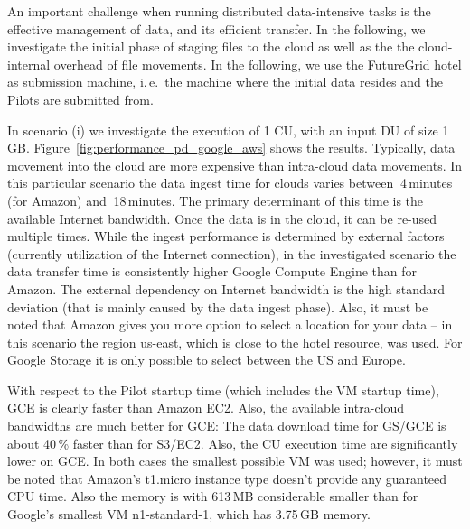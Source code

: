 \documentclass[times]{cpeauth}
\newcommand{\pilot}{Pilot\xspace}
\newcommand{\pilots}{Pilots\xspace}
\newcommand{\du}{DU\xspace}
\newcommand{\cu}{CU\xspace}
\begin{document}
An important challenge when running distributed data-intensive tasks is the 
effective management of data, and its efficient transfer. In the following, we 
investigate the initial phase of staging files to the cloud as well as the 
the cloud-internal overhead of file movements.  In the following, we use the 
FutureGrid hotel as submission machine, i.\,e.\ the machine where the initial 
data resides and the \pilots are submitted from.

In scenario (i) we investigate the execution of 1 \cu, with an input \du of
size 1\,GB. Figure~\ref{fig:performance_pd_google_aws} shows the results.
Typically, data movement into the cloud are more expensive than intra-cloud
data movements. In this particular scenario the data ingest time for clouds
varies between $~$4\,minutes (for Amazon) and $~$18\,minutes. The primary
determinant of this time is the available Internet bandwidth. Once the data is
in the cloud, it can be re-used multiple times. While the ingest performance
is determined by external factors (currently utilization of the Internet
connection), in the investigated scenario the data transfer time is
consistently higher Google Compute Engine than for Amazon. The external
dependency on Internet bandwidth is the high standard deviation (that is
mainly caused by the data ingest phase). Also, it must be noted that Amazon
gives you more option to select a location for your data -- in this scenario
the region us-east, which is close to the hotel resource, was used. For Google 
Storage it is only possible to select between the US and Europe.

With respect to the \pilot startup time (which includes the VM startup time), 
GCE is clearly faster than Amazon EC2. Also, the available intra-cloud 
bandwidths are much better for GCE: The data download time for GS/GCE is about 
40\,\% faster than for S3/EC2. Also, the \cu execution time are significantly 
lower on GCE. In both cases the smallest possible VM was used; however, it 
must be noted that Amazon's t1.micro instance type doesn't provide any 
guaranteed CPU time. Also the memory is with 613\,MB considerable smaller than 
for Google's smallest VM n1-standard-1, which has 3.75\,GB memory.
\end{document}
